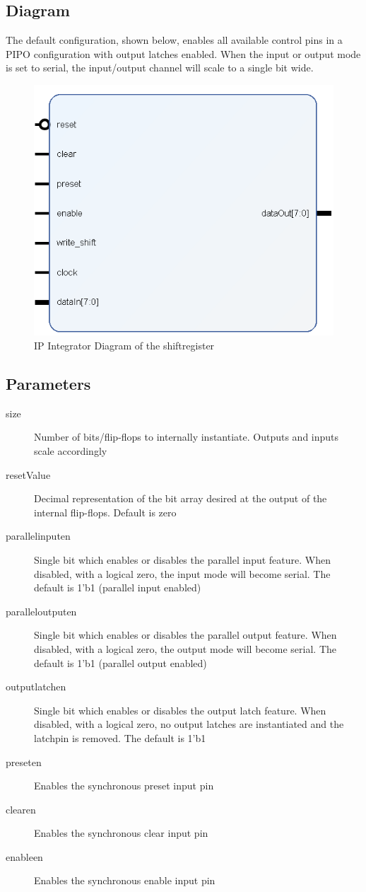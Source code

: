 \documentclass[11pt]{article}
\begin{document}
\subsection{Diagram}
The default configuration, shown below, enables all available control pins in a PIPO configuration with output latches enabled.
When the input or output mode is set to serial, the input/output channel will scale to a single bit wide.
\begin{figure}[H]
	\centering
	\includegraphics[width=0.4\linewidth]{images/shift_register}
	\caption{IP Integrator Diagram of the shift\textunderscore register}
\end{figure}
\subsection{Parameters}
\begin{description}
	\item[size]Number of bits/flip-flops to internally instantiate. Outputs and inputs scale accordingly
	\item[resetValue]Decimal representation of the bit array desired at the output of the internal flip-flops. Default is zero
	\item[parallel\textunderscore input\textunderscore en]Single bit which enables or disables the parallel input feature. When disabled, with a logical
		zero, the input mode will become serial. The default is 1'b1 (parallel input enabled)
	\item[parallel\textunderscore output\textunderscore en]Single bit which enables or disables the parallel output feature. When disabled, with a logical
		zero, the output mode will become serial. The default is 1'b1 (parallel output enabled)
	\item[output\textunderscore latch\textunderscore en]Single bit which enables or disables the output latch feature. When disabled, with a logical zero,
		no output latches are instantiated and the latch\textunderscore pin is removed. The default is 1'b1
	\item[preset\textunderscore en]Enables the synchronous preset input pin
	\item[clear\textunderscore en]Enables the synchronous clear input pin
	\item[enable\textunderscore en]Enables the synchronous enable input pin
\end{description}
\end{document}
